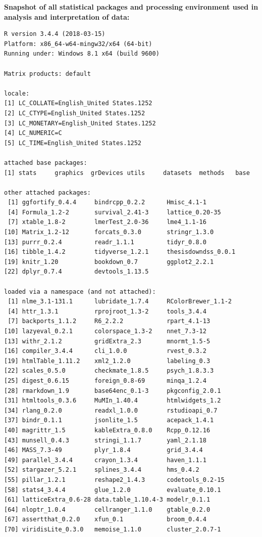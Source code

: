 \documentclass[12pt,oneside]{dukestatscithesis} %
\theoremstyle{definition}
\theoremstyle{definition}
\theoremstyle{definition}
\theoremstyle{remark}
\begin{document}
\textbf{Snapshot of all statistical packages and processing environment used in analysis and interpretation of data:}
\begin{verbatim}
R version 3.4.4 (2018-03-15)
Platform: x86_64-w64-mingw32/x64 (64-bit)
Running under: Windows 8.1 x64 (build 9600)

Matrix products: default

locale:
[1] LC_COLLATE=English_United States.1252 
[2] LC_CTYPE=English_United States.1252   
[3] LC_MONETARY=English_United States.1252
[4] LC_NUMERIC=C                          
[5] LC_TIME=English_United States.1252    

attached base packages:
[1] stats     graphics  grDevices utils     datasets  methods   base     

other attached packages:
 [1] ggfortify_0.4.4     bindrcpp_0.2.2      Hmisc_4.1-1        
 [4] Formula_1.2-2       survival_2.41-3     lattice_0.20-35    
 [7] xtable_1.8-2        lmerTest_2.0-36     lme4_1.1-16        
[10] Matrix_1.2-12       forcats_0.3.0       stringr_1.3.0      
[13] purrr_0.2.4         readr_1.1.1         tidyr_0.8.0        
[16] tibble_1.4.2        tidyverse_1.2.1     thesisdowndss_0.0.1
[19] knitr_1.20          bookdown_0.7        ggplot2_2.2.1      
[22] dplyr_0.7.4         devtools_1.13.5    

loaded via a namespace (and not attached):
 [1] nlme_3.1-131.1      lubridate_1.7.4     RColorBrewer_1.1-2 
 [4] httr_1.3.1          rprojroot_1.3-2     tools_3.4.4        
 [7] backports_1.1.2     R6_2.2.2            rpart_4.1-13       
[10] lazyeval_0.2.1      colorspace_1.3-2    nnet_7.3-12        
[13] withr_2.1.2         gridExtra_2.3       mnormt_1.5-5       
[16] compiler_3.4.4      cli_1.0.0           rvest_0.3.2        
[19] htmlTable_1.11.2    xml2_1.2.0          labeling_0.3       
[22] scales_0.5.0        checkmate_1.8.5     psych_1.8.3.3      
[25] digest_0.6.15       foreign_0.8-69      minqa_1.2.4        
[28] rmarkdown_1.9       base64enc_0.1-3     pkgconfig_2.0.1    
[31] htmltools_0.3.6     MuMIn_1.40.4        htmlwidgets_1.2    
[34] rlang_0.2.0         readxl_1.0.0        rstudioapi_0.7     
[37] bindr_0.1.1         jsonlite_1.5        acepack_1.4.1      
[40] magrittr_1.5        kableExtra_0.8.0    Rcpp_0.12.16       
[43] munsell_0.4.3       stringi_1.1.7       yaml_2.1.18        
[46] MASS_7.3-49         plyr_1.8.4          grid_3.4.4         
[49] parallel_3.4.4      crayon_1.3.4        haven_1.1.1        
[52] stargazer_5.2.1     splines_3.4.4       hms_0.4.2          
[55] pillar_1.2.1        reshape2_1.4.3      codetools_0.2-15   
[58] stats4_3.4.4        glue_1.2.0          evaluate_0.10.1    
[61] latticeExtra_0.6-28 data.table_1.10.4-3 modelr_0.1.1       
[64] nloptr_1.0.4        cellranger_1.1.0    gtable_0.2.0       
[67] assertthat_0.2.0    xfun_0.1            broom_0.4.4        
[70] viridisLite_0.3.0   memoise_1.1.0       cluster_2.0.7-1    
\end{verbatim}
\backmatter
\end{document}

